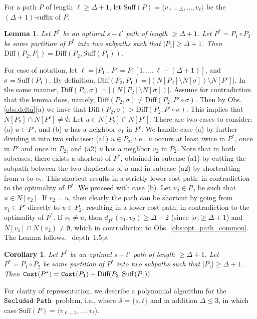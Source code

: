 \documentclass[12pt]{article}
\newtheorem{lemma}[theorem]{Lemma}
\newtheorem{corollary}[theorem]{Corollary}
\def\Cost{\mbox{\tt Cost}}
\def\Proof{\par\noindent{\bf Proof:~}}
\def\blackslug{\hbox{\hskip 1pt \vrule width 4pt height 8pt
    depth 1.5pt \hskip 1pt}}
\def\QED{\quad\blackslug\lower 8.5pt\null\par}
\newcommand{\MAXDEG}[0]{\Delta}
\newcommand{\DIFF}[0]{\mbox{Diff}}
\newcommand{\Terminals}[0]{\mathcal{S}}
\newcommand{\PP}[0]{$\mbox{\tt Secluded}$ $\mbox{\tt Path}$}
\newcommand{\DegAnyConst}[0]{\MAXDEG+1}
\newcommand{\Suff}[0]{\mathrm{Suff}}
\def\Cost{\mbox{\tt Cost}}
\begin{document}
For a path $P$ of length $\ell \geq \DegAnyConst$, let $\Suff(P)=\langle v_{\ell-\MAXDEG}, \ldots, v_{\ell} \rangle$ be the $(\DegAnyConst)$-suffix of $P$.
\begin{lemma}
\label{lem:opt_path_common}
Let $P^{*}$ be an optimal $s-t'$ path of length $\geq \DegAnyConst$. Let $P^{*}=P_1 \circ P_2$ be some partition of $P^{*}$ into two subpaths such that $|P_1| \geq \DegAnyConst$. Then $\DIFF(P_2,P_1)=\DIFF(P_2, \Suff(P_1))$.
\end{lemma}
\Proof
For ease of notation, let $\ell=|P_1|$, $P'=P_1[1, \ldots, \ell-(\DegAnyConst)]$, and $\sigma=\Suff(P_1)$. By definition, $\DIFF(P_2,P_1)=|\left(N[P_2] \setminus N[\sigma] \right) \setminus N[P']|$. In the same manner, $\DIFF(P_2,\sigma)=|\left(N[P_2] \setminus N[\sigma] \right)|$.  Assume for contradiction that the lemma does, namely, $\DIFF(P_2,\sigma) \neq \DIFF(P_2,P' \circ \sigma)$. Then by Obs. \ref{obs:delta}(a) we have that $\DIFF(P_2,\sigma)>\DIFF(P_2,P' \circ \sigma)$. This implies that $N[P_2] \cap  N[P']\neq \emptyset$. Let $u \in N[P_2] \cap  N[P']$. There are two cases to consider: (a) $u \in P'$, and (b) $u$ has a neighbor $v_1$ in $P'$. We handle case (a) by further dividing it into two subcases: (a1) $u \in P_2$, i.e., $u$ occurs at least twice in $P^{*}$, once in $P'$ and once in $P_2$, and (a2) $u$ has a neighbor $v_2$ in $P_2$. Note that in both subcases, there exists a shortcut of $P^{*}$, obtained in subcase (a1) by cutting the subpath between the two duplicates of $u$ and in subcase (a2) by shortcutting from $u$ to $v_2$.  This shortcut results in a strictly lower cost path, in contradiction to the optimality of $P^{*}$. We proceed with case (b).
Let $v_2 \in P_2$ be such that $u \in N[v_2]$. If $v_2=u$, then clearly the path can be shortcut by going from $v_1 \in P'$ directly to $u \in P_2$, resulting in a lower cost path, in contradiction to the optimality of $P^{*}$. If $v_2 \neq u$, then $d_{P^{*}}(v_1,v_2)\geq \MAXDEG+2$ (since $|\sigma|\geq \DegAnyConst$) and $N[v_1] \cap N(v_2) \neq \emptyset$, which in contradiction to Obs. \ref{obs:opt_path_common}. The Lemma follows.
\QED
\begin{corollary}
\label{cor:opt_path_common}
Let $P^{*}$ be an optimal $s-t'$ path of length $\geq \DegAnyConst$. Let $P^{*}=P_1 \circ P_2$ be some partition of $P^{*}$ into two subpaths such that $|P_1| \geq \DegAnyConst$. Then $\Cost(P^{*})=\Cost(P_1)+\DIFF(P_2,\Suff(P_1))$.
\end{corollary}
For clarity of representation, we describe a polynomial algorithm for the \PP\ problem, i.e., where $\Terminals=\{s,t\}$ and in addition $\MAXDEG\leq 3$, in which case $\Suff(P)=\langle v_{\ell-3}, \ldots, v_{\ell} \rangle$.
\end{document}
